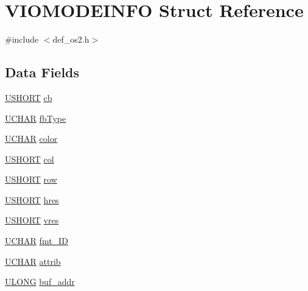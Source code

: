 \hypertarget{structVIOMODEINFO}{\section{V\+I\+O\+M\+O\+D\+E\+I\+N\+F\+O Struct Reference}
\label{structVIOMODEINFO}
}


{\ttfamily \#include $<$def\+\_\+os2.\+h$>$}

\subsection*{Data Fields}
\begin{DoxyCompactItemize}
\item 
\hyperlink{def__os2_8h_a5850d5316caf7f4cedd742fdf8cd7c02}{U\+S\+H\+O\+R\+T} \hyperlink{structVIOMODEINFO_ab0107362493f36f117ffdd7b4514d1ce}{cb}
\item 
\hyperlink{def__os2_8h_a4f4bb67531a9bf6f0b9c6ad76aeba587}{U\+C\+H\+A\+R} \hyperlink{structVIOMODEINFO_a4d8146fc112731562eaac6acc292e71f}{fb\+Type}
\item 
\hyperlink{def__os2_8h_a4f4bb67531a9bf6f0b9c6ad76aeba587}{U\+C\+H\+A\+R} \hyperlink{structVIOMODEINFO_a35795dc6f758025eac0ff0c9f60fc171}{color}
\item 
\hyperlink{def__os2_8h_a5850d5316caf7f4cedd742fdf8cd7c02}{U\+S\+H\+O\+R\+T} \hyperlink{structVIOMODEINFO_a4aac5aaed3a88446cb0b13a00a4baf23}{col}
\item 
\hyperlink{def__os2_8h_a5850d5316caf7f4cedd742fdf8cd7c02}{U\+S\+H\+O\+R\+T} \hyperlink{structVIOMODEINFO_a6d0d195c623566d400856ead2f5fbc3e}{row}
\item 
\hyperlink{def__os2_8h_a5850d5316caf7f4cedd742fdf8cd7c02}{U\+S\+H\+O\+R\+T} \hyperlink{structVIOMODEINFO_a3258514160c07a36e40b534530c12a1e}{hres}
\item 
\hyperlink{def__os2_8h_a5850d5316caf7f4cedd742fdf8cd7c02}{U\+S\+H\+O\+R\+T} \hyperlink{structVIOMODEINFO_aac092b75ab712f4a6ab11fc6f267ac29}{vres}
\item 
\hyperlink{def__os2_8h_a4f4bb67531a9bf6f0b9c6ad76aeba587}{U\+C\+H\+A\+R} \hyperlink{structVIOMODEINFO_aeaca215380b3e91bb6c061c0a3aa0ff3}{fmt\+\_\+\+I\+D}
\item 
\hyperlink{def__os2_8h_a4f4bb67531a9bf6f0b9c6ad76aeba587}{U\+C\+H\+A\+R} \hyperlink{structVIOMODEINFO_a2815b90fcdb6ea1010ebea29641b6536}{attrib}
\item 
\hyperlink{def__os2_8h_af632da489ebc3708ec3ab6791ee53fa4}{U\+L\+O\+N\+G} \hyperlink{structVIOMODEINFO_a6e4510f2f1e4c50b764514c353b5134c}{buf\+\_\+addr}

\end{DoxyCompactItemize}
